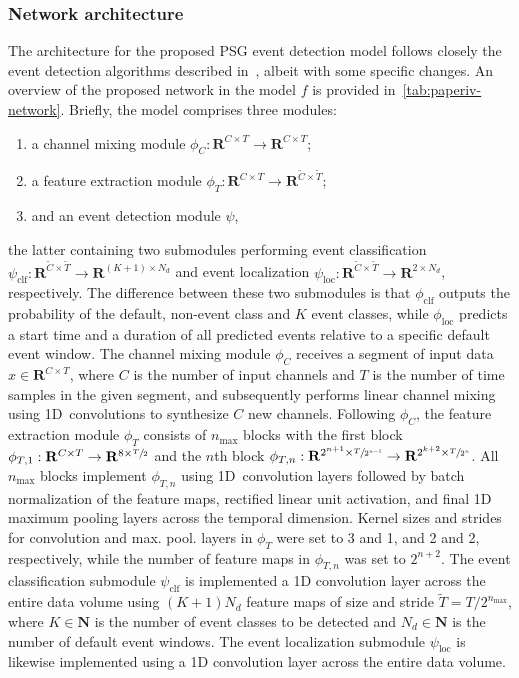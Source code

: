 \subsubsection{Network architecture}
The architecture for the proposed \ac{PSG} event detection model follows closely the event detection algorithms described in~\cite{Chambon2018b,Chambon2019}, albeit with some specific changes.
An overview of the proposed network in the model $f$ is provided in~\cref{tab:paperiv-network}.
Briefly, the model comprises three modules:
\begin{enumerate}
\item a channel mixing module $\phi_{C} : \mathbf{R}^{C \times T} \to \mathbf{R}^{C \times T}$;
\item a feature extraction module $\phi_{T} : \mathbf{R}^{C \times T} \to \mathbf{R}^{\tilde{C} \times \tilde{T}}$;
\item and an event detection module $\psi$,
\end{enumerate}
the latter containing two submodules performing event classification $\psi_{\mathrm{clf}} : \mathbf{R}^{\tilde{C} \times \tilde{T}} \to \mathbf{R}^{(K+1)\times N_{d}} $ and event localization $\psi_{\mathrm{loc}} : \mathbf{R}^{\tilde{C} \times \tilde{T}} \to \mathbf{R}^{2 \times N_{d}}$, respectively.
The difference between these two submodules is that $\phi_{\mathrm{clf}}$ outputs the probability of the default, non-event class and $K$ event classes, while $\phi_{\mathrm{loc}}$ predicts a start time and a duration of all predicted events relative to a specific default event window.
The channel mixing module $\phi_{C}$ receives a segment of input data $x \in \mathbf{R}^{C \times T}$, where $C$ is the number of input channels and $T$ is the number of time samples in the given segment, and subsequently performs linear channel mixing using 1D~convolutions to synthesize $C$ new channels. 
Following $\phi_{C}$, the feature extraction module $\phi_{T}$ consists of $n_{\max}$ blocks with the first block $\phi_{T,1} : \mathbf{R}^{C \times T} \to \mathbf{R}^{8 \times \sfrac{T}{2}}$ and the $n$th block $\phi_{T,n} : \mathbf{R}^{2^{n+1} \times \sfrac{T}{2^{n-1}}} \to \mathbf{R}^{2^{k+2} \times \sfrac{T}{2^{n}}}$.
All $n_{\max}$ blocks implement $\phi_{T,n}$ using 1D~convolution layers followed by batch normalization of the feature maps, rectified linear unit activation, and final 1D maximum pooling layers across the temporal dimension.
Kernel sizes and strides for convolution and max. pool. layers in $\phi_{T}$ were set to 3 and 1, and 2 and 2, respectively, while the number of feature maps in $\phi_{T,n}$ was set to $2^{n+2}$.
The event classification submodule $\psi_{\mathrm{clf}}$ is implemented a 1D convolution layer across the entire data volume using $(K+1)N_{d}$ feature maps of size and stride $\tilde{T} = T/2^{n_{\max}}$, where $K \in \mathbf{N}$ is the number of event classes to be detected and $N_{d} \in \mathbf{N}$ is the number of default event windows.
The event localization submodule $\psi_{\mathrm{loc}}$ is likewise implemented using a 1D convolution layer across the entire data volume.

